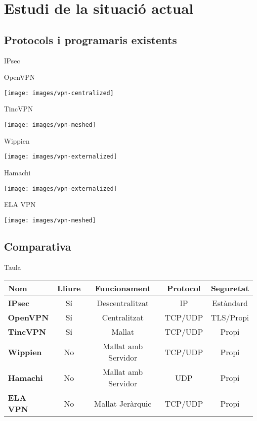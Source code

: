 \section{Estudi de la situació actual}
\subsection{Protocols i programaris existents}
    \begin{frame}{IPsec}
    \end{frame}
    \begin{frame}{OpenVPN}
        \begin{center}
        \texttt{[image: images/vpn-centralized]}
        \end{center}
    \end{frame}
    \begin{frame}{TincVPN}
        \begin{center}
        \texttt{[image: images/vpn-meshed]}
        \end{center}
    \end{frame}
    \begin{frame}{Wippien}
        \begin{center}
        \texttt{[image: images/vpn-externalized]}
        \end{center}
    \end{frame}
    \begin{frame}{Hamachi}
        \begin{center}
        \texttt{[image: images/vpn-externalized]}
        \end{center}
    \end{frame}
    \begin{frame}{ELA VPN}
        \begin{center}
        \texttt{[image: images/vpn-meshed]}
        \end{center}
    \end{frame}

\subsection{Comparativa}
    \begin{frame}{Taula}
        \begin{center}
\begin{tabular}{|l|c|c|c|c|}
\hline
Nom & Lliure & Funcionament & Protocol & Seguretat \\ \hline \hline
\bf IPsec & Sí & Descentralitzat & IP & Estàndard \\ \hline
\bf OpenVPN & Sí & Centralitzat & TCP/UDP & TLS/Propi \\ \hline
\bf TincVPN & Sí & Mallat & TCP/UDP & Propi \\ \hline
\bf Wippien & No & Mallat amb Servidor & TCP/UDP & Propi \\ \hline
\bf Hamachi & No & Mallat amb Servidor & UDP & Propi \\ \hline
\bf ELA VPN & No & Mallat Jeràrquic & TCP/UDP & Propi \\ \hline
\end{tabular}
        \end{center}
    \end{frame}
